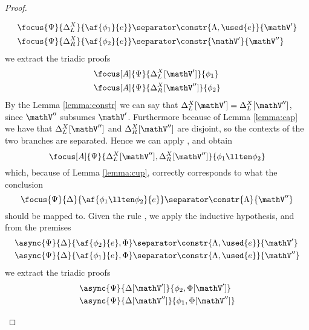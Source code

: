\begin{proof}
\begin{itemize}
			\begin{align*}
				&\focus{\Psi}{\Delta_L^X}{\af{\phi_1}{e}} \separator \constr{\Lambda, \used{e}}{\mathV'} \\
				&\focus{\Psi}{\Delta_R^X}{\af{\phi_2}{e}} \separator \constr{\mathV'}{\mathV''} 
			\end{align*}
			we extract the triadic proofs
			\begin{align*}
				&\focus[A]{\Psi}{\Delta_L^X[\mathV']}{\phi_1} \\
				&\focus[A]{\Psi}{\Delta_R^X[\mathV'']}{\phi_2} 
			\end{align*}
			By the Lemma \ref{lemma:constr} we can say that $\Delta_L^X[\mathV'] = \Delta_L^X[\mathV'']$, since $\mathV''$ subsumes $\mathV'$.
			Furthermore because of Lemma \ref{lemma:cap} we have that $\Delta_L^X[\mathV'']$ and $\Delta_R^X[\mathV'']$ are disjoint, so the contexts of the two branches are separated.
			Hence we can apply \derRule[A]{\displayten}, and obtain
			$$ \focus[A]{\Psi}{\Delta_L^X[\mathV''], \Delta_R^X[\mathV'']}{\phi_1 \llten \phi_2} $$
			which, because of Lemma \ref{lemma:cup}, correctly corresponds to what the conclusion
			$$ \focus{\Psi}{\Delta}{\af{\phi_1 \llten \phi_2}{e}} \separator \constr{\Lambda}{\mathV''} $$
			should be mapped to.
		\indCase{\displaywith} Given the rule \derRule{\displaywith}, we apply the inductive hypothesis, and from the premises 
			\begin{align*}
				&\async{\Psi}{\Delta}{\af{\phi_2}{e}, \Phi} \separator \constr{\Lambda, \used{e}}{\mathV'} \\
				&\async{\Psi}{\Delta}{\af{\phi_1}{e}, \Phi} \separator \constr{\Lambda, \used{e}}{\mathV''} 
			\end{align*}
			we extract the triadic proofs
			\begin{align*}
				&\async{\Psi}{\Delta[\mathV']}{\phi_2, \Phi[\mathV']} \\
				&\async{\Psi}{\Delta[\mathV'']}{\phi_1, \Phi[\mathV'']}
			\end{align*}

\end{itemize}
\end{proof}

